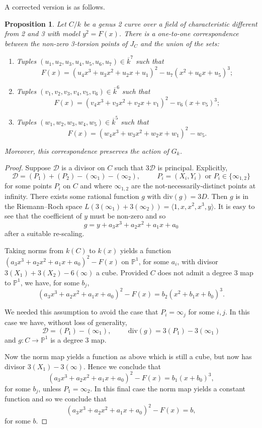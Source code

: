 \documentclass[12pt]{amsart}
\newtheorem{proposition}[theorem]{Proposition}
\theoremstyle{definition}
\theoremstyle{remark}
\newcommand{\Proj}{\mathbb{P}}
\renewcommand{\div}{\mathrm{div}}
\renewcommand{\bar}{\overline}
\begin{document}
A corrected version is as follows.

\begin{proposition}\label{prop:genus2tors}
    Let $C/k$ be a genus 2 curve over a field of characteristic different from 2 and 3 with model $y^2=F(x)$. There is a one-to-one correspondence between the non-zero 3-torsion points of $J_{C}$ and the union of the sets:
    \begin{enumerate}
        \item Tuples $(u_1,u_2,u_3,u_4,u_5,u_6,u_7)\in \bar{k}^7$ such that
        \[F(x)=(u_4x^3+u_3x^2+u_2x+u_1)^2-u_7(x^2+u_6x+u_5)^3;\]
        \item Tuples $(v_1,v_2,v_3,v_4,v_5,v_6)\in \bar{k}^6$ such that
        \[F(x)=(v_4x^3+v_3x^2+v_2x+v_1)^2-v_6(x+v_5)^3;\]
        \item Tuples $(w_1,w_2,w_3,w_4,w_5)\in \bar{k}^5$ such that
        \[F(x)=(w_4x^3+w_3x^2+w_2x+w_1)^2-w_5.\]
    \end{enumerate}
    Moreover, this correspondence preserves the action of $G_k$.
\end{proposition}

\begin{proof}
    Suppose $\mathcal{D}$ is a divisor on ${C}$ such that $3\mathcal{D}$ is principal. Explicitly,
\[ \mathcal{D} = (P_1)+(P_2)-(\infty_1)-(\infty_2), \hspace{1cm} P_i=(X_i,Y_i) \text{ or } P_i\in\{\infty_{1,2}\}\]
for some points $P_i$ on ${C}$ and where $\infty_{1,2}$ are the not-necessarily-distinct points at infinity. There exists some rational function $g$ with $\div(g)=3D$.
Then $g$ is in the Riemann--Roch space ${L}(3(\infty_1)+3(\infty_2))=\langle1,x,x^2,x^3,y\rangle$. It is easy to see that the coefficient of $y$ must be non-zero and so
\[g=y+a_3x^3+a_2x^2+a_1x+a_0\]
after a suitable re-scaling.

Taking norms from $k({C})$ to $k(x)$ yields a function $(a_3x^3+a_2x^2+a_1x+a_0)^2-F(x)$ on $\Proj^1$, for some $a_i$, with divisor $3(X_1)+3(X_2)-6(\infty)$ a cube. Provided ${C}$ does not admit a degree 3 map to $\Proj^1$, we have, for some $b_j$,
\[(a_3x^3+a_2x^2+a_1x+a_0)^2-F(x)=b_2(x^2+b_1x+b_0)^3.\]

We needed this assumption to avoid the case that $P_i=\infty_j$ for some $i,j$. In this case we have, without loss of generality,
\[\mathcal{D}=(P_1)-(\infty_1), \hspace{1cm} \div(g)=3(P_1)-3(\infty_1)\] 
and $g: {C}\to \Proj^1$ is a degree 3 map. 

Now the norm map yields a function as above which is still a cube, but now has divisor $3(X_1)-3(\infty)$. Hence we conclude that
\[(a_3x^3+a_2x^2+a_1x+a_0)^2-F(x)=b_1(x+b_0)^3,\]
for some $b_j$, unless $P_1=\infty_2$. In this final case the norm map yields a constant function and so we conclude that
\[(a_3x^3+a_2x^2+a_1x+a_0)^2-F(x)=b,\]
for some $b$.
\end{proof}
\end{document}
